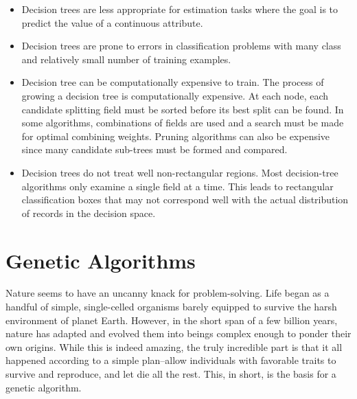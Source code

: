 \documentclass[12pt]{report}
\begin{document}
\begin{itemize}
\item{Decision trees are less appropriate for estimation tasks where the goal is to predict the value of a continuous attribute.}
\item{Decision trees are prone to errors in classification problems with many class and relatively small number of training examples.}
\item{Decision tree can be computationally expensive to train. The process of growing a decision tree is computationally expensive. At each node, each candidate splitting field must be sorted before its best split can be found. In some algorithms, combinations of fields are used and a search must be made for optimal combining weights. Pruning algorithms can also be expensive since many candidate sub-trees must be formed and compared.}
\item{Decision trees do not treat well non-rectangular regions. Most decision-tree algorithms only examine a single field at a time. This leads to rectangular classification boxes that may not correspond well with the actual distribution of records in the decision space. }

\end{itemize}





\pagestyle{fancy}
\chead{}
\rfoot{\small{\thepage}}
\renewcommand{\headrulewidth}{0.4pt}
\renewcommand{\footrulewidth}{0.4pt}

\chapter{Genetic Algorithms}

Nature seems to have an uncanny knack for problem-solving. Life began as a handful of simple, single-celled organisms barely equipped to survive the harsh environment of planet Earth. However, in the short span of a few billion years, nature has adapted and evolved them into beings complex enough to ponder their own origins. While this is indeed amazing, the truly incredible part is that it all happened according to a simple plan--allow individuals with favorable traits to survive and reproduce, and let die all the rest. This, in short, is the basis for a genetic algorithm. 
\end{document}
